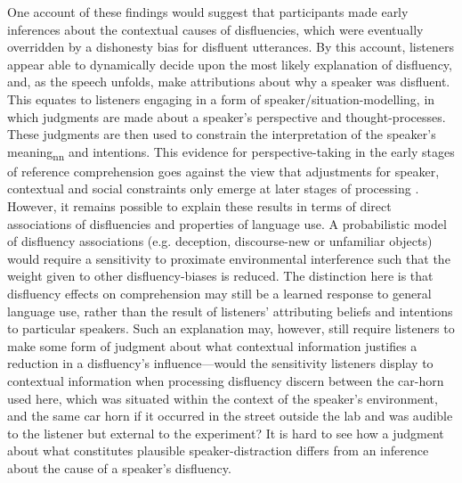 \documentclass[man]{apa6}
\begin{document}
One account of these findings would suggest that participants made early inferences about the contextual causes of disfluencies, which were eventually overridden by a dishonesty bias for disfluent utterances. 
By this account, listeners appear able to dynamically decide upon the most likely explanation of disfluency, and, as the speech unfolds, make attributions about why a speaker was disfluent. 
This equates to listeners engaging in a form of speaker/situation-modelling, in which judgments are made about a speaker's perspective and thought-processes. 
These judgments are then used to constrain the interpretation of the speaker's meaning\textsubscript{nn} and intentions. 
This evidence for perspective-taking in the early stages of reference comprehension goes against the view that adjustments for speaker, contextual and social constraints only emerge at later stages of processing \citep{Kronmuller2007}.\\

However, it remains possible to explain these results in terms of direct associations of disfluencies and properties of language use. 
A probabilistic model of disfluency associations (e.g. deception, discourse-new or unfamiliar objects) would require a sensitivity to proximate environmental interference such that the weight given to other disfluency-biases is reduced. 
The distinction here is that disfluency effects on comprehension may still be a learned response to general language use, rather than the result of listeners' attributing beliefs and intentions to particular speakers. 
Such an explanation may, however, still require listeners to make some form of judgment about what contextual information justifies a reduction in a disfluency's influence---would the sensitivity listeners display to contextual information when processing disfluency discern between the car-horn used here, which was situated within the context of the speaker's environment, and the same car horn if it occurred in the street outside the lab and was audible to the listener but external to the experiment? 
It is hard to see how a judgment about what constitutes plausible speaker-distraction differs from an inference about the cause of a speaker's disfluency.\\
\end{document}
